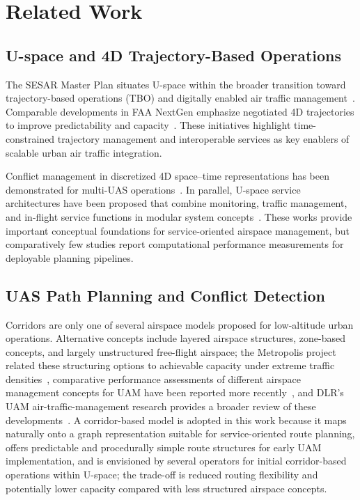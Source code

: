 \section{Related Work}
\label{sec:related}

\subsection{U-space and 4D Trajectory-Based Operations}

The SESAR Master Plan situates U-space within the broader transition toward trajectory-based operations (TBO) and digitally enabled air traffic management~\cite{sesar_master_plan_2025}. Comparable developments in FAA NextGen emphasize negotiated 4D trajectories to improve predictability and capacity~\cite{enea_porretta_4d_tbo_comparison}. These initiatives highlight time-constrained trajectory management and interoperable services as key enablers of scalable urban air traffic integration.

Conflict management in discretized 4D space--time representations has been demonstrated for multi-UAS operations~\cite{acevedo_4d_grids_u_space}. In parallel, U-space service architectures have been proposed that combine monitoring, traffic management, and in-flight service functions in modular system concepts~\cite{uspace_inflight_services_architecture}. These works provide important conceptual foundations for service-oriented airspace management, but comparatively few studies report computational performance measurements for deployable planning pipelines.

\subsection{UAS Path Planning and Conflict Detection}

Corridors are only one of several airspace models proposed for low-altitude urban operations. Alternative concepts include layered airspace structures, zone-based concepts, and largely unstructured free-flight airspace; the Metropolis project related these structuring options to achievable capacity under extreme traffic densities~\cite{sunil2015metropolis,schneider2014metropolis}, comparative performance assessments of different airspace management concepts for UAM have been reported more recently~\cite{abdellaoui2025_airspace_uam}, and DLR's UAM air-traffic-management research provides a broader review of these developments~\cite{schuchardt2023_atm_uam_review}. A corridor-based model is adopted in this work because it maps naturally onto a graph representation suitable for service-oriented route planning, offers predictable and procedurally simple route structures for early UAM implementation, and is envisioned by several operators for initial corridor-based operations within U-space; the trade-off is reduced routing flexibility and potentially lower capacity compared with less structured airspace concepts.

